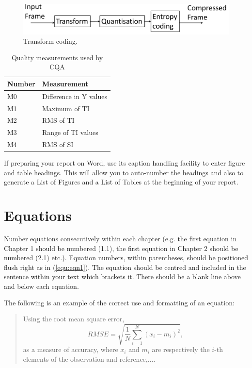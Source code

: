 \begin{figure}[htb]
\centering
\includegraphics[width = 0.9\columnwidth]{style_guide_fig1.pdf}
\caption{Transform coding.}
\label{fig:fig1}
\end{figure}

\begin{table}[htb]
\centering
\begin{tabular}{|l|l|}
\hline
\textbf{Number} &  \textbf{Measurement} \\
\hline 
M0 & Difference in Y values \\
\hline
M1 & Maximum of TI \\
\hline 
M2 & RMS of TI \\
\hline 
M3 &  Range of TI values \\
\hline
M4 & RMS of SI \\
\hline
\end{tabular}
\caption{Quality measurements used by CQA}
\label{tab:tab1}
\end{table}

If preparing your report on Word, use its caption handling facility to enter figure and table headings. This will allow you to auto-number the 
headings and also to generate a List of Figures and a List of Tables at the beginning of your report. 

\section{Equations} 
Number equations consecutively within each chapter (e.g. the first equation in Chapter 1 should be numbered 
(1.1), the first equation in Chapter 2 should be numbered (2.1) etc.). Equation numbers, within parentheses, 
should be positioned flush right as in (\ref{equ:eqn1}). The equation should be centred and included in the sentence within your text which brackets it. There should be a blank line above and below each equation. 

The following is an example of the correct use and formatting of an equation:

\begin{quote}
Using the root mean square error,
\begin{equation}
RMSE = \sqrt{\frac{1}{N} \sum_{i=1}^{N}(x_i - m_i)^2},
\label{equ:eqn1}
\end{equation}
as a measure of accuracy, where $x_i$ and $m_i$ are respectively the $i$-th elements of the observation and reference,....
\end{quote}